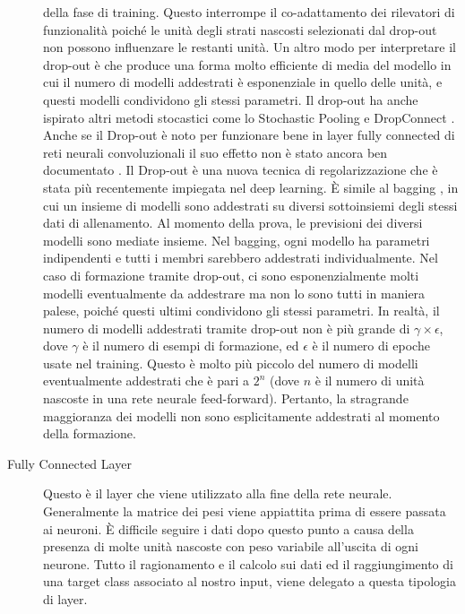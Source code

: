 \begin{description}
    della fase di training. 
    Questo interrompe il co-adattamento dei rilevatori di funzionalità poiché le unità degli strati nascosti 
    selezionati dal drop-out non possono influenzare le restanti unità. Un altro modo per interpretare il drop-out 
    è che produce una forma molto efficiente di media del modello in cui il numero di modelli addestrati è 
    esponenziale in quello delle unità, e questi modelli condividono gli stessi parametri. Il drop-out ha anche
    ispirato altri metodi stocastici come lo Stochastic Pooling \cite{zeiler2013stochastic} e 
    DropConnect \cite{wan2013regularization}. 
    Anche se il Drop-out è noto per funzionare bene in layer fully connected di reti neurali convoluzionali il 
    suo effetto non è stato ancora ben documentato \cite{wan2013regularization, zeiler2013stochastic,
    krizhevsky2017imagenet}.
    Il Drop-out è una nuova tecnica di regolarizzazione che è stata più recentemente impiegata nel deep learning. 
    È simile al bagging \cite{breiman1996bagging}, in cui un insieme di modelli sono addestrati su diversi sottoinsiemi
    degli stessi dati di allenamento. Al momento della prova, le previsioni dei diversi modelli sono mediate insieme.
    Nel bagging, ogni modello ha parametri indipendenti e tutti i membri sarebbero addestrati individualmente. 
    Nel caso di formazione tramite drop-out, ci sono esponenzialmente molti modelli eventualmente da
    addestrare ma non lo sono tutti in maniera palese, poiché questi ultimi condividono gli stessi parametri. 
    In realtà, il numero di modelli addestrati tramite drop-out non è più grande di $\gamma \times \epsilon$, 
    dove $\gamma$ è il numero di esempi di formazione, ed $\epsilon$ è il numero di epoche usate nel training. 
    Questo è molto più piccolo del numero di modelli eventualmente addestrati che è pari a $2^n$ 
    (dove $n$ è il numero di unità nascoste in una rete neurale feed-forward). Pertanto, la stragrande maggioranza 
    dei modelli non sono esplicitamente addestrati al momento della formazione.
    \item[Fully Connected Layer] Questo è il layer che viene utilizzato alla fine della rete neurale. 
    Generalmente la matrice dei pesi viene appiattita prima di essere passata ai neuroni. È difficile seguire i 
    dati dopo questo punto a causa della presenza di molte unità nascoste con peso variabile all'uscita di ogni 
    neurone. Tutto il ragionamento e il calcolo sui dati ed il raggiungimento di una target class associato al 
    nostro input, viene delegato a questa tipologia di layer.
\end{description}

